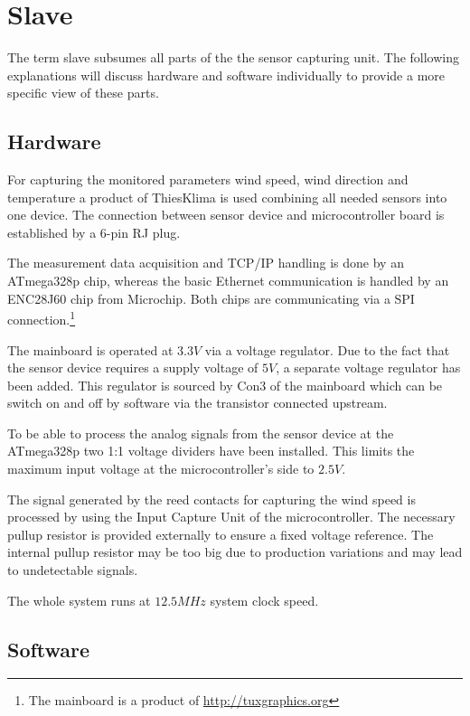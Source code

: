 
\chapter{Slave}

The term slave subsumes all parts of the the sensor capturing unit.
The following explanations will discuss hardware and software individually to provide a more specific view of these parts.

\section{Hardware}
For capturing the monitored parameters wind speed, wind direction and temperature a product of ThiesKlima is used combining all needed sensors into one device. The connection between sensor device and microcontroller board is established by a 6-pin RJ plug.

The measurement data acquisition and TCP/IP handling is done by an ATmega328p chip, whereas the basic Ethernet communication is handled by an ENC28J60 chip from Microchip. Both chips are communicating via a SPI connection.\footnote{The mainboard is a product of \url{http://tuxgraphics.org}} 

The mainboard is operated at $3.3 V$ via a voltage regulator. Due to the fact that the sensor device requires a supply voltage of $5 V$, a separate voltage regulator has been added. This regulator is sourced by Con3 of the mainboard which can be switch on and off by software via the transistor connected upstream.

To be able to process the analog signals from the sensor device at the ATmega328p two 1:1 voltage dividers have been installed. This limits the maximum input voltage at the microcontroller's side to $2.5 V$.

The signal generated by the reed contacts for capturing the wind speed is processed by using the Input Capture Unit of the microcontroller. The necessary pullup resistor is provided externally to ensure a fixed voltage reference. The internal pullup resistor may be too big due to production variations and may lead to undetectable signals.

The whole system runs at $12.5 MHz$ system clock speed.

\section{Software}

